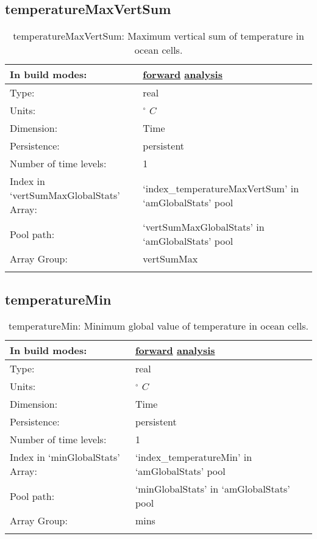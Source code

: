 \subsection[temperatureMaxVertSum]{temperatureMaxVertSum}
\label{subsec:var_sec_amGlobalStats_temperatureMaxVertSum}
\begin{center}
\begin{longtable}{| p{2.0in} | p{4.0in} |}
        \hline 
        In build modes: & \hyperref[subsec:forward_var_tab_amGlobalStats]{forward} \hyperref[subsec:analysis_var_tab_amGlobalStats]{analysis} \\
        \hline 
        Type: & real \\
        \hline 
        Units: & $^\circ$ $C$ \\
        \hline 
        Dimension: & Time \\
        \hline 
        Persistence: & persistent \\
        \hline 
        Number of time levels: & 1 \\
        \hline 
		 Index in `vertSumMaxGlobalStats' Array: & `index\_temperatureMaxVertSum' in `amGlobalStats' pool \\
		 \hline 
            Pool path: & `vertSumMaxGlobalStats' in `amGlobalStats' pool \\
		 \hline 
		 Array Group: & vertSumMax \\
		 \hline 
    \caption{temperatureMaxVertSum: Maximum vertical sum of temperature in ocean cells.}
\end{longtable}
\end{center}
\subsection[temperatureMin]{temperatureMin}
\label{subsec:var_sec_amGlobalStats_temperatureMin}
\begin{center}
\begin{longtable}{| p{2.0in} | p{4.0in} |}
        \hline 
        In build modes: & \hyperref[subsec:forward_var_tab_amGlobalStats]{forward} \hyperref[subsec:analysis_var_tab_amGlobalStats]{analysis} \\
        \hline 
        Type: & real \\
        \hline 
        Units: & $^\circ$ $C$ \\
        \hline 
        Dimension: & Time \\
        \hline 
        Persistence: & persistent \\
        \hline 
        Number of time levels: & 1 \\
        \hline 
		 Index in `minGlobalStats' Array: & `index\_temperatureMin' in `amGlobalStats' pool \\
		 \hline 
            Pool path: & `minGlobalStats' in `amGlobalStats' pool \\
		 \hline 
		 Array Group: & mins \\
		 \hline 
    \caption{temperatureMin: Minimum global value of temperature in ocean cells.}
\end{longtable}
\end{center}

